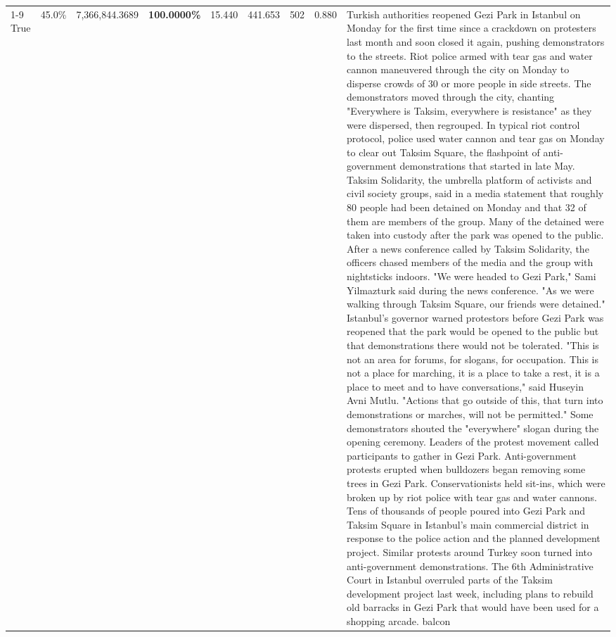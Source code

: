 \begin{table}[H]
\begin{tabular}{lllrlllll}
\cline{1-9}
True & 45.0\% & 7,366,844.3689 & \bfseries \color{red} 100.0000\% & 15.440 & 441.653 & 502 & 0.880 & Turkish authorities reopened Gezi Park in Istanbul on Monday for the first time since a crackdown on protesters last month and soon closed it again, pushing demonstrators to the streets. Riot police armed with tear gas and water cannon maneuvered through the city on Monday to disperse crowds of 30 or more people in side streets. The demonstrators moved through the city, chanting "Everywhere is Taksim, everywhere is resistance" as they were dispersed, then regrouped. In typical riot control protocol, police used water cannon and tear gas on Monday to clear out Taksim Square, the flashpoint of anti-government demonstrations that started in late May. Taksim Solidarity, the umbrella platform of activists and civil society groups, said in a media statement that roughly 80 people had been detained on Monday and that 32 of them are members of the group. Many of the detained were taken into custody after the park was opened to the public. After a news conference called by Taksim Solidarity, the officers chased members of the media and the group with nightsticks indoors. "We were headed to Gezi Park," Sami Yilmazturk said during the news conference. "As we were walking through Taksim Square, our friends were detained." Istanbul's governor warned protestors before Gezi Park was reopened that the park would be opened to the public but that demonstrations there would not be tolerated. "This is not an area for forums, for slogans, for occupation. This is not a place for marching, it is a place to take a rest, it is a place to meet and to have conversations," said Huseyin Avni Mutlu. "Actions that go outside of this, that turn into demonstrations or marches, will not be permitted." Some demonstrators shouted the "everywhere" slogan during the opening ceremony. Leaders of the protest movement called participants to gather in Gezi Park. Anti-government protests erupted when bulldozers began removing some trees in Gezi Park. Conservationists held sit-ins, which were broken up by riot police with tear gas and water cannons. Tens of thousands of people poured into Gezi Park and Taksim Square in Istanbul's main commercial district in response to the police action and the planned development project. Similar protests around Turkey soon turned into anti-government demonstrations. The 6th Administrative Court in Istanbul overruled parts of the Taksim development project last week, including plans to rebuild old barracks in Gezi Park that would have been used for a shopping arcade. balcon \\

\end{tabular}
\end{table}

